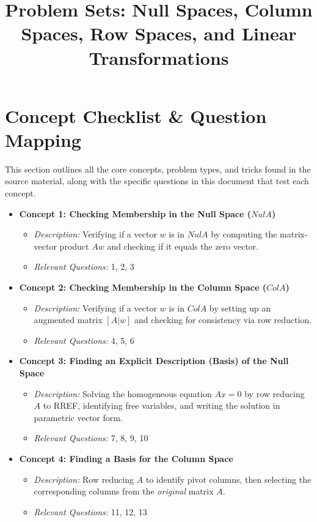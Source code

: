\documentclass[11pt]{article}
\title{Problem Sets: Null Spaces, Column Spaces, Row Spaces, and Linear Transformations}
\author{}
\date{}
\begin{document}
\maketitle
\tableofcontents
\newpage

\section{Concept Checklist \& Question Mapping}

This section outlines all the core concepts, problem types, and tricks found in the source material, along with the specific questions in this document that test each concept.

\begin{itemize}
    \item \textbf{Concept 1: Checking Membership in the Null Space ($Nul A$)}
    \begin{itemize}
        \item \textit{Description:} Verifying if a vector $w$ is in $Nul A$ by computing the matrix-vector product $Aw$ and checking if it equals the zero vector.
        \item \textit{Relevant Questions:} 1, 2, 3
    \end{itemize}
    
    \item \textbf{Concept 2: Checking Membership in the Column Space ($Col A$)}
    \begin{itemize}
        \item \textit{Description:} Verifying if a vector $w$ is in $Col A$ by setting up an augmented matrix $[A | w]$ and checking for consistency via row reduction.
        \item \textit{Relevant Questions:} 4, 5, 6
    \end{itemize}

    \item \textbf{Concept 3: Finding an Explicit Description (Basis) of the Null Space}
    \begin{itemize}
        \item \textit{Description:} Solving the homogeneous equation $Ax = 0$ by row reducing $A$ to RREF, identifying free variables, and writing the solution in parametric vector form.
        \item \textit{Relevant Questions:} 7, 8, 9, 10
    \end{itemize}

    \item \textbf{Concept 4: Finding a Basis for the Column Space}
    \begin{itemize}
        \item \textit{Description:} Row reducing $A$ to identify pivot columns, then selecting the corresponding columns from the \textit{original} matrix $A$.
        \item \textit{Relevant Questions:} 11, 12, 13
    \end{itemize}


\end{itemize}
\end{document}
